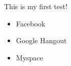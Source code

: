 \documentclass[a4paper,12pt]{article}
\begin{document}
This is my first test!

\begin{itemize}
	\item Facebook
	\item Google Hangout
	\item Myspace

\end{itemize}
\end{document}

